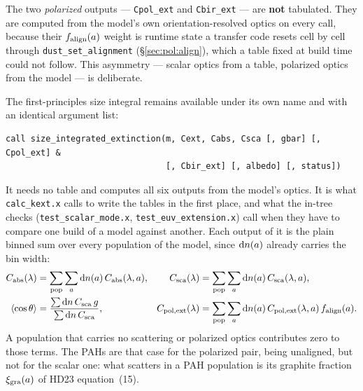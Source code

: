\documentclass{my_memo}
\newcommand{\code}[1]{\texttt{#1}}
\begin{document}
The two \emph{polarized} outputs --- \code{Cpol\_ext} and \code{Cbir\_ext} ---
are \textbf{not} tabulated. They are computed from the model's own
orientation-resolved optics on every call, because their $f_{\rm align}(a)$
weight is runtime state a transfer code resets cell by cell through
\code{dust\_set\_alignment} (\S\ref{sec:pol:align}), which a table fixed at
build time could not follow. This asymmetry --- scalar optics from a table,
polarized optics from the model --- is deliberate.

The first-principles size integral remains available under its own name and
with an identical argument list:
\begin{lstlisting}
call size_integrated_extinction(m, Cext, Cabs, Csca [, gbar] [, Cpol_ext] &
                                [, Cbir_ext] [, albedo] [, status])
\end{lstlisting}
It needs no table and computes all six outputs from the model's optics. It is
what \code{calc\_kext.x} calls to write the tables in the first place, and what
the in-tree checks (\code{test\_scalar\_mode.x},
\code{test\_euv\_extension.x}) call when they have to compare one build of a
model against another. Each output of it is the plain binned sum over every
population of the model, since ${\rm d}n(a)$ already carries the bin width:
\begin{align}
C_{\rm abs}(\lambda) &= \sum_{\rm pop}\sum_a {\rm d}n(a)\,C_{\rm abs}(\lambda,a), &
C_{\rm sca}(\lambda) &= \sum_{\rm pop}\sum_a {\rm d}n(a)\,C_{\rm sca}(\lambda,a), \nonumber\\
\langle\cos\theta\rangle &= \frac{\sum {\rm d}n\,C_{\rm sca}\,g}{\sum {\rm d}n\,C_{\rm sca}}, &
C_{\rm pol,ext}(\lambda) &= \sum_{\rm pop}\sum_a {\rm d}n(a)\,C_{\rm pol,ext}(\lambda,a)\,f_{\rm align}(a).
\label{eq:extsums}
\end{align}
A population that carries no scattering or polarized optics contributes zero to
those terms. The PAHs are that case for the polarized pair, being unaligned,
but not for the scalar one: what scatters in a PAH population is its graphite
fraction $\xi_{\rm gra}(a)$ of HD23 equation~(15).
\end{document}
